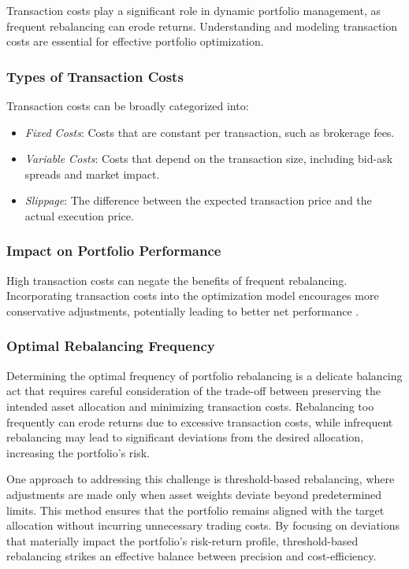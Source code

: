 Transaction costs play a significant role in dynamic portfolio management, as frequent rebalancing can erode returns. Understanding and modeling transaction costs are essential for effective portfolio optimization.

\subsubsection{Types of Transaction Costs}

Transaction costs can be broadly categorized into:

\begin{itemize}
    \item \textit{Fixed Costs}: Costs that are constant per transaction, such as brokerage fees.
    \item \textit{Variable Costs}: Costs that depend on the transaction size, including bid-ask spreads and market impact.
    \item \textit{Slippage}: The difference between the expected transaction price and the actual execution price.
\end{itemize}

\subsubsection{Impact on Portfolio Performance}

High transaction costs can negate the benefits of frequent rebalancing. Incorporating transaction costs into the optimization model encourages more conservative adjustments, potentially leading to better net performance \cite{garleanu2009dynamic}.

\subsubsection{Optimal Rebalancing Frequency}

Determining the optimal frequency of portfolio rebalancing is a delicate balancing act that requires careful consideration of the trade-off between preserving the intended asset allocation and minimizing transaction costs. Rebalancing too frequently can erode returns due to excessive transaction costs, while infrequent rebalancing may lead to significant deviations from the desired allocation, increasing the portfolio’s risk.

One approach to addressing this challenge is threshold-based rebalancing, where adjustments are made only when asset weights deviate beyond predetermined limits. This method ensures that the portfolio remains aligned with the target allocation without incurring unnecessary trading costs. By focusing on deviations that materially impact the portfolio's risk-return profile, threshold-based rebalancing strikes an effective balance between precision and cost-efficiency.

